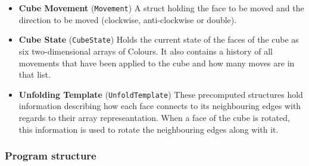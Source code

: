 \documentclass[8pt]{article}
\begin{document}
\begin{itemize}

    \item \textbf{Cube Movement} (\texttt{Movement}) A struct holding the face to
    be moved and the direction to be moved (clockwise, anti-clockwise or double).

    \item \textbf{Cube State} (\texttt{CubeState}) Holds the current state of the
    faces of the cube as six two-dimensional arrays of Colours. It also contains
    a history of all movements that have been applied to the cube and how many moves
    are in that list.

    \item \textbf{Unfolding Template} (\texttt{UnfoldTemplate}) These precomputed
    structures hold information describing how each face connects to its neighbouring
    edges with regards to their array represeantation. When a face of the cube is rotated, this
    information is used to rotate the neighbouring edges along with it.

\end{itemize}

\subsubsection{Program structure}
\end{document}
